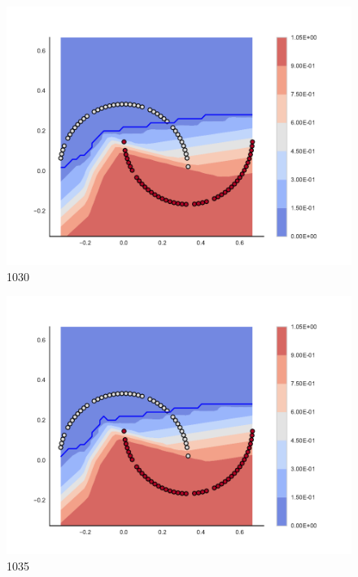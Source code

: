 \begin{subfigure}[b]{0.09\textwidth}
    \includegraphics[clip, trim=2.35cm 1.75cm 4.5cm 0cm,width=\textwidth]{img/convergence/1030.pdf}
    \caption{1030}
    \label{fig:convergence_1030}
\end{subfigure}
%
\begin{subfigure}[b]{0.09\textwidth}
    \includegraphics[clip, trim=2.35cm 1.75cm 4.5cm 0cm,width=\textwidth]{img/convergence/1035.pdf}
    \caption{1035}
    \label{fig:convergence_1035}
\end{subfigure}
%
